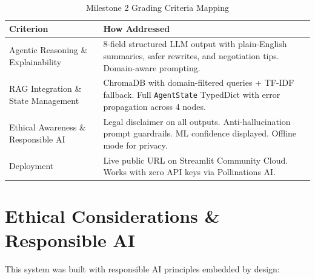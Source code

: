 \documentclass[12pt,a4paper]{article}
\begin{document}
\begin{table}[h]
\centering
\begin{tabularx}{\textwidth}{lX}
\toprule
\textbf{Criterion} & \textbf{How Addressed} \\
\midrule
Agentic Reasoning \& Explainability & 8-field structured LLM output with plain-English summaries, safer rewrites, and negotiation tips. Domain-aware prompting. \\
RAG Integration \& State Management & ChromaDB with domain-filtered queries + TF-IDF fallback. Full \texttt{AgentState} TypedDict with error propagation across 4 nodes. \\
Ethical Awareness \& Responsible AI & Legal disclaimer on all outputs. Anti-hallucination prompt guardrails. ML confidence displayed. Offline mode for privacy. \\
Deployment & Live public URL on Streamlit Community Cloud. Works with zero API keys via Pollinations AI. \\
\bottomrule
\end{tabularx}
\caption{Milestone 2 Grading Criteria Mapping}
\end{table}

\section{Ethical Considerations \& Responsible AI}
\label{sec:ethics}

This system was built with responsible AI principles embedded by design:
\end{document}
